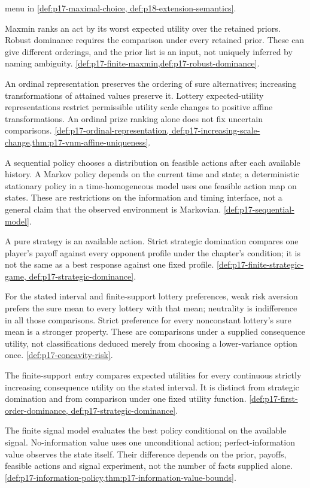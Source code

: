 \begin{description}[style=nextline,leftmargin=0pt]
menu in \cref{def:p17-maximal-choice,
def:p18-extension-semantics}.
\item[Maxmin expected utility; robust dominance.]
Maxmin ranks an act by its worst expected utility over the retained
priors. Robust dominance requires the comparison under every retained
prior. These can give different orderings, and the prior list is an
input, not uniquely inferred by naming ambiguity.
\cref{def:p17-finite-maxmin,def:p17-robust-dominance}.
\item[Ordinal representation; cardinal lottery utility.]
An ordinal representation preserves the ordering of sure alternatives;
increasing transformations of attained values preserve it. Lottery
expected-utility representations restrict permissible utility scale
changes to positive affine transformations. An ordinal prize ranking
alone does not fix uncertain comparisons.
\cref{def:p17-ordinal-representation,
def:p17-increasing-scale-change,thm:p17-vnm-affine-uniqueness}.
\item[Policy; Markov policy; stationary policy.]
A sequential policy chooses a distribution on feasible actions after
each available history. A Markov policy depends on the current time and
state; a deterministic stationary policy in a time-homogeneous model
uses one feasible action map on states. These are restrictions on the
information and timing interface, not a general claim that the observed
environment is Markovian. \cref{def:p17-sequential-model}.
\item[Pure strategy; strategic dominance.]
A pure strategy is an available action. Strict strategic domination
compares one player's payoff against every opponent profile under the
chapter's condition; it is not the same as a best response against one
fixed profile. \cref{def:p17-finite-strategic-game,
def:p17-strategic-dominance}.
\item[Risk aversion; risk neutrality.]
For the stated interval and finite-support lottery preferences, weak risk
aversion prefers the sure mean to every lottery with that mean; neutrality
is indifference in all those comparisons. Strict preference for every
nonconstant lottery's sure mean is a stronger property. These are
comparisons under a supplied consequence utility, not classifications
deduced merely from choosing a lower-variance option once.
\cref{def:p17-concavity-risk}.
\item[Stochastic dominance: first order.]
The finite-support entry compares expected utilities for every continuous
strictly increasing consequence utility on the stated interval. It is
distinct from strategic domination and from comparison under one fixed
utility function. \cref{def:p17-first-order-dominance,
def:p17-strategic-dominance}.
\item[Value of information; perfect information.]
The finite signal model evaluates the best policy conditional on the
available signal. No-information value uses one unconditional action;
perfect-information value observes the state itself. Their difference
depends on the prior, payoffs, feasible actions and signal experiment,
not the number of facts supplied alone.
\cref{def:p17-information-policy,thm:p17-information-value-bounds}.
\end{description}

